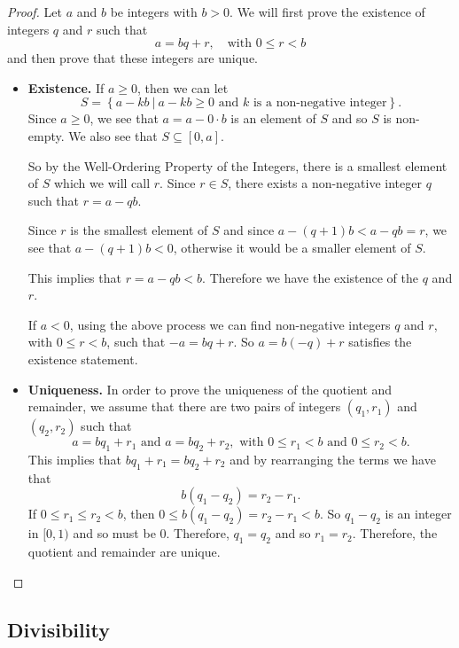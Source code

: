 \documentclass[
]{book}
\theoremstyle{definition}
\theoremstyle{definition}
\theoremstyle{definition}
\theoremstyle{definition}
\theoremstyle{remark}
\begin{document}
\begin{proof}

Let \(a\) and \(b\) be integers with \(b>0\). We will first prove the existence of integers \(q\) and \(r\) such that \[a=bq+r, \quad \mbox{with } 0\leq r <b\] and then prove that these integers are unique.

\begin{itemize}
\item
  \textbf{Existence.} If \(a\geq 0\), then we can let
  \[S= \left\{ a-kb \: \vert  \: a-kb\geq 0 \mbox{ and $k$ is a non-negative integer}\right\}.\]
  Since \(a\geq 0\), we see that \(a=a-0\cdot b\) is an element of \(S\) and so \(S\) is non-empty. We also see that \(S \subseteq [0,a]\).

  So by the Well-Ordering Property of the Integers, there is a smallest element of \(S\) which we will call \(r\). Since \(r\in S\), there exists a non-negative integer \(q\) such that \(r=a-qb\).

  Since \(r\) is the smallest element of \(S\) and since \(a-(q+1)b<a-qb=r\), we see that \(a-(q+1)b<0\), otherwise it would be a smaller element of \(S\).

  This implies that \(r=a-qb<b\). Therefore we have the existence of the \(q\) and \(r\).

  If \(a<0\), using the above process we can find non-negative integers \(q\) and \(r\), with \(0\leq r<b\), such that \(-a=bq+r\). So \(a=b(-q)+r\) satisfies the existence statement.
\item
  \textbf{Uniqueness.} In order to prove the uniqueness of the quotient and remainder, we assume that there are two pairs of integers \((q_1,r_1)\) and \((q_2,r_2)\) such that
  \[a= b q_1 + r_1 \mbox{ and } a= b q_2 + r_2, \mbox{ with } 0\leq r_1<b \mbox{ and } 0\leq r_2 <b.\]
  This implies that \(b q_1 + r_1 = b q_2 + r_2\) and by rearranging the terms we have that \[b (q_1 - q_2) = r_2-r_1.\] If \(0 \leq r_1 \leq r_2<b\), then \(0 \leq b(q_1-q_2)=r_2-r_1<b\). So \(q_1-q_2\) is an integer in \([0,1)\) and so must be \(0\). Therefore, \(q_1=q_2\) and so \(r_1=r_2\). Therefore, the quotient and remainder are unique.
\end{itemize}

\end{proof}

\hypertarget{divisibility}{%
\subsection{Divisibility}\label{divisibility}}
\end{document}
